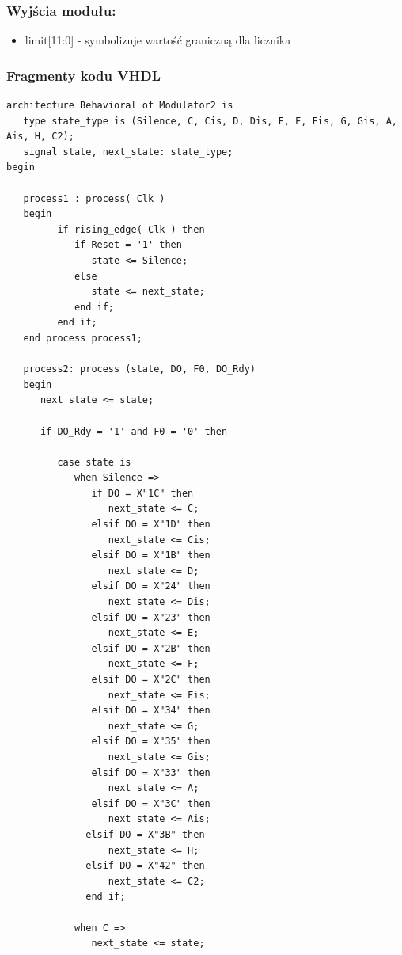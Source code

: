 \documentclass[a4paper,11pt]{article}
\begin{document}
\subsubsection*{Wyjścia modułu:}
\begin{itemize}
\item limit[11:0] - symbolizuje wartość graniczną dla licznika
\end{itemize}

\subsubsection*{Fragmenty kodu VHDL}
\begin{lstlisting}[caption=Procesy modułu Modulator2.]
architecture Behavioral of Modulator2 is
   type state_type is (Silence, C, Cis, D, Dis, E, F, Fis, G, Gis, A, Ais, H, C2);
   signal state, next_state: state_type;
begin

   process1 : process( Clk )
   begin
         if rising_edge( Clk ) then
            if Reset = '1' then
               state <= Silence;
            else
               state <= next_state;
            end if;
         end if;
   end process process1;
   
   process2: process (state, DO, F0, DO_Rdy)
   begin
      next_state <= state;
      
      if DO_Rdy = '1' and F0 = '0' then
      
         case state is
            when Silence =>
               if DO = X"1C" then
                  next_state <= C;
               elsif DO = X"1D" then
                  next_state <= Cis;
               elsif DO = X"1B" then
                  next_state <= D;
               elsif DO = X"24" then
                  next_state <= Dis;
               elsif DO = X"23" then
                  next_state <= E;
               elsif DO = X"2B" then
                  next_state <= F;
               elsif DO = X"2C" then
                  next_state <= Fis;
               elsif DO = X"34" then
                  next_state <= G;
               elsif DO = X"35" then
                  next_state <= Gis;
               elsif DO = X"33" then
                  next_state <= A;
               elsif DO = X"3C" then
                  next_state <= Ais;
              elsif DO = X"3B" then
                  next_state <= H;
              elsif DO = X"42" then
                  next_state <= C2;
              end if;
              
            when C =>
               next_state <= state;
               

\end{lstlisting}
\end{document}
